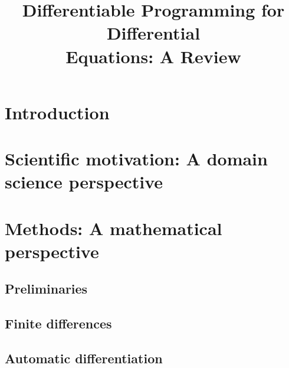 \documentclass[11pt]{article}
\title{Differentiable Programming for Differential \\ Equations: A Review}
\date{}
\begin{document}
\maketitle


\begin{abstract}

\end{abstract}
\newpage 



\tableofcontents

\mbox{}
\vfill

\newpage

% 

\section{Introduction}


\section{Scientific motivation: A domain science perspective}
\label{sectopn:motivation}


\section{Methods: A mathematical perspective}
\label{section:methods}


\subsection{Preliminaries}
\label{section:preliminaries}


\subsection{Finite differences}
\label{section:finite-diffences}


\subsection{Automatic differentiation}
\label{section:automatic-differentiation}

\end{document}
